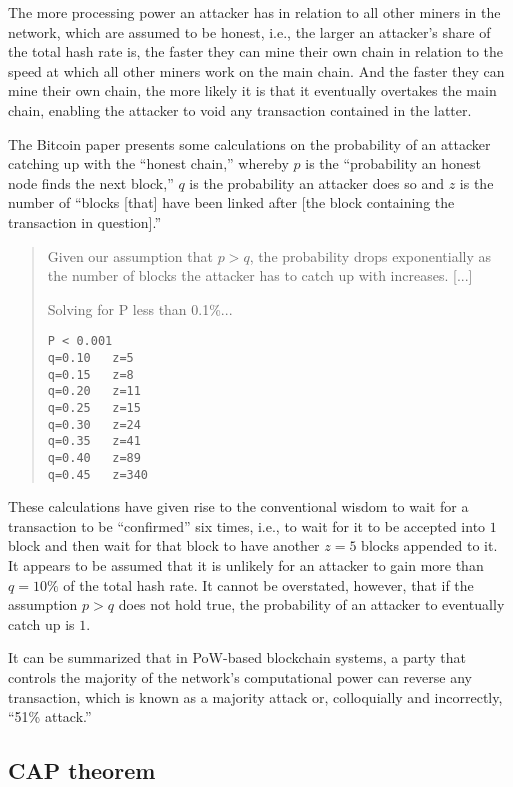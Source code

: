 The more processing power an attacker has in relation to all other miners in the network, which are assumed to be honest, i.e., the larger an attacker's share of the total hash rate is, the faster they can mine their own chain in relation to the speed at which all other miners work on the main chain.
And the faster they can mine their own chain, the more likely it is that it eventually overtakes the main chain, enabling the attacker to void any transaction contained in the latter.

The Bitcoin paper presents some calculations on the probability of an attacker catching up with the ``honest chain,'' whereby $p$ is the ``probability an honest node finds the next block,'' $q$ is the probability an attacker does so and $z$ is the number of ``blocks [that] have been linked after [the block containing the transaction in question].''

\begin{quote}
	Given our assumption that $p > q$, the probability drops exponentially as the number of blocks the attacker has to catch up with increases. [...]

	Solving for P less than 0.1\%...

	\begin{verbatim}
P < 0.001
q=0.10   z=5
q=0.15   z=8
q=0.20   z=11
q=0.25   z=15
q=0.30   z=24
q=0.35   z=41
q=0.40   z=89
q=0.45   z=340
	\end{verbatim}
\end{quote}

These calculations have given rise to the conventional wisdom to wait for a transaction to be ``confirmed'' \autocite{bitcoinwiki2018confirmation} six times, i.e., to wait for it to be accepted into $1$ block and then wait for that block to have another $z = 5$ blocks appended to it.
It appears to be assumed that it is unlikely for an attacker to gain more than $q = 10\%$ of the total hash rate.
It cannot be overstated, however, that if the assumption $p > q$ does not hold true, the probability of an attacker to eventually catch up is $1$.

It can be summarized that in PoW-based blockchain systems, a party that controls the majority of the network's computational power can reverse any transaction, which is known as a majority attack or, colloquially and incorrectly, ``51\% attack.''

\subsection{CAP theorem}

